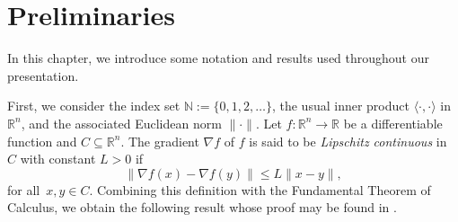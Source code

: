 \chapter{Preliminaries}  \label{chap:Prel}
\thispagestyle{empty}


In this chapter, we introduce  some notation and results used throughout our presentation.

First, we  consider the  index set  ${\mathbb{N}}:=\{0,1,2,\ldots\}$,  the usual inner  product  $\langle \cdot,\cdot \rangle$ in $\mathbb{R}^n$, and the associated Euclidean norm    $\|\cdot\|$.
Let  $f:\mathbb{R}^n \to \mathbb{R}$ be a differentiable function and $C \subseteq \mathbb{R}^n$. The  gradient $\nabla f$ of $f$ is said to be {\it Lipschitz continuous} in $C$ with constant $L>0$ if
$$
	\|\nabla f(x)-\nabla f(y)\|\leq L \|x-y\|,
$$
for all~$x, y\in C$. Combining this definition with the Fundamental Theorem of Calculus, we obtain the following result whose proof may be found in \cite[Proposition A.24]{Bertsekas1999}.

